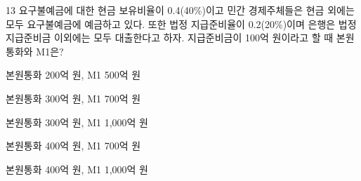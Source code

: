 \begin{question}{13}
요구불예금에 대한 현금 보유비율이 0.4(40\%)이고 민간 경제주체들은 현금 외에는 모두 요구불예금에 예금하고 있다. 또한 법정 지급준비율이 0.2(20\%)이며 은행은 법정 지급준비금 이외에는 모두 대출한다고 하자. 지급준비금이 100억 원이라고 할 때 본원통화와 M1은?
\begin{choices}
  \item 본원통화 200억 원, M1 500억 원
  \item 본원통화 300억 원, M1 700억 원
  \item 본원통화 300억 원, M1 1,000억 원
  \item 본원통화 400억 원, M1 700억 원
  \item 본원통화 400억 원, M1 1,000억 원
\end{choices}
\end{question}
